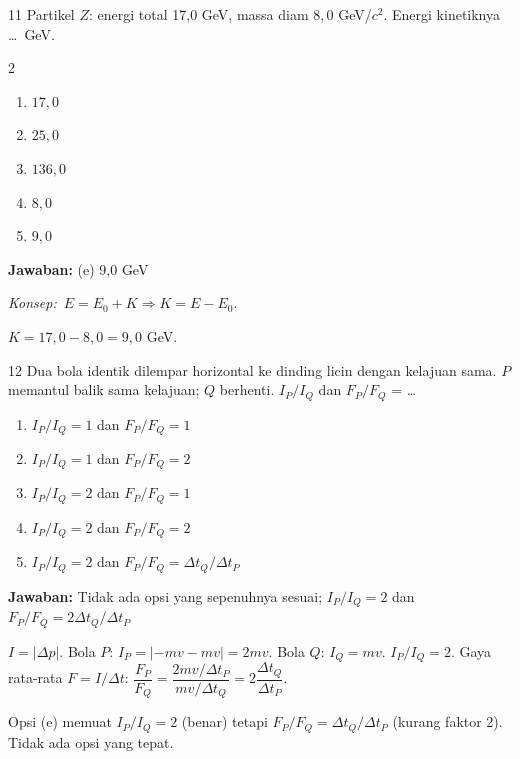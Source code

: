 \documentclass[11pt]{article}
\newcommand{\jawaban}[1]{%
  \noindent\colorbox{gold!30}{\parbox{\dimexpr\linewidth-2\fboxsep\relax}{%
    \textbf{Jawaban:} #1}}\par\smallskip}
\newcommand{\konsep}{\noindent\textit{Konsep:}\ \ignorespaces}
\newenvironment{pil}{%
  \begin{enumerate}[label=(\alph*),leftmargin=*,itemsep=1pt,topsep=3pt]}%
  {\end{enumerate}}
\newenvironment{pilB}{%
  \par\smallskip\begin{multicols}{2}
  \begin{enumerate}[label=(\alph*),leftmargin=*,itemsep=1pt,topsep=3pt]}%
  {\end{enumerate}\end{multicols}}
\begin{document}

\begin{soal}{11}
Partikel $Z$: energi total 17{,}0 GeV, massa diam $8{,}0$ GeV/$c^2$.
Energi kinetiknya \ldots\ GeV.
\begin{pilB}
  \item $17{,}0$ \item $25{,}0$ \item $136{,}0$ \item $8{,}0$ \item $9{,}0$
\end{pilB}
\end{soal}
\begin{pembox}
\jawaban{(e) 9,0 GeV}
\konsep $E=E_0+K\Rightarrow K=E-E_0$.

$K=17{,}0-8{,}0=9{,}0$ GeV.
\end{pembox}

\begin{soal}{12}
Dua bola identik dilempar horizontal ke dinding licin dengan kelajuan sama.
$P$ memantul balik sama kelajuan; $Q$ berhenti. $I_P/I_Q$ dan $F_P/F_Q$ = \ldots
\begin{pil}
  \item $I_P/I_Q=1$ dan $F_P/F_Q=1$
  \item $I_P/I_Q=1$ dan $F_P/F_Q=2$
  \item $I_P/I_Q=2$ dan $F_P/F_Q=1$
  \item $I_P/I_Q=2$ dan $F_P/F_Q=2$
  \item $I_P/I_Q=2$ dan $F_P/F_Q=\Delta t_Q/\Delta t_P$
\end{pil}
\end{soal}
\begin{pembox}
\jawaban{Tidak ada opsi yang sepenuhnya sesuai; $I_P/I_Q=2$ dan $F_P/F_Q=2\Delta t_Q/\Delta t_P$}
$I=|\Delta p|$. Bola $P$: $I_P=|-mv-mv|=2mv$. Bola $Q$: $I_Q=mv$.
$I_P/I_Q=2$. Gaya rata-rata $F=I/\Delta t$:
$\dfrac{F_P}{F_Q}=\dfrac{2mv/\Delta t_P}{mv/\Delta t_Q}=2\dfrac{\Delta t_Q}{\Delta t_P}$.
\begin{catatbox}
Opsi (e) memuat $I_P/I_Q=2$ (benar) tetapi $F_P/F_Q=\Delta t_Q/\Delta t_P$ (kurang faktor 2). Tidak ada opsi yang tepat.
\end{catatbox}
\end{pembox}
\end{document}
